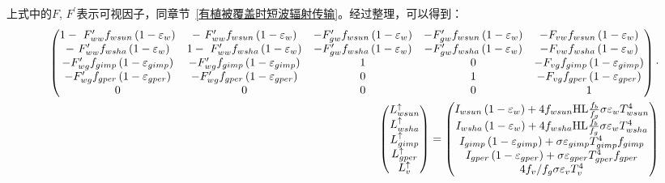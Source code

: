 \begin{landscape}
上式中的$F$, $F^\prime$表示可视因子，同章节~\ref{有植被覆盖时短波辐射传输}。经过整理，可以得到：
\begin{equation}
    \begin{split}
    \left(\begin{matrix}1-\ F_{ww}^\prime f_{wsun}\left(1-\varepsilon_w\right)&-\ F_{ww}^\prime f_{wsun}\left(1-\varepsilon_w\right)&-F_{gw}^\prime f_{wsun}\left(1-\varepsilon_w\right)&-F_{gw}^\prime f_{wsun}\left(1-\varepsilon_w\right)&-F_{vw}f_{wsun}\left(1-\varepsilon_w\right)\\
    -\ F_{ww}^\prime f_{wsha}\left(1-\varepsilon_w\right)&1-\ F_{ww}^\prime f_{wsha}\left(1-\varepsilon_w\right)&-F_{gw}^\prime f_{wsha}\left(1-\varepsilon_w\right)&-F_{gw}^\prime f_{wsha}\left(1-\varepsilon_w\right)&-F_{vw}f_{wsha}\left(1-\varepsilon_w\right)\\
    -F_{wg}^\prime f_{gimp}\left(1-\varepsilon_{gimp}\right)&-F_{wg}^\prime f_{gimp}\left(1-\varepsilon_{gimp}\right)&1&0&-F_{vg}f_{gimp}\left(1-\varepsilon_{gimp}\right)\\
    -F_{wg}^\prime f_{gper}\left(1-\varepsilon_{gper}\right)&-F_{wg}^\prime f_{gper}\left(1-\varepsilon_{gper}\right)&0&1&-F_{vg}f_{gper}\left(1-\varepsilon_{gper}\right)\\
    0&0&0&0&1\\\end{matrix}\right)\cdot \\
    \left(\begin{matrix}L_{wsun}^\uparrow\\L_{wsha}^\uparrow\\L_{gimp}^\uparrow\\L_{gper}^\uparrow\\L_v^\uparrow\\\end{matrix}\right)
    =\left(\begin{matrix}I_{wsun}\left(1-\varepsilon_w\right)+4f_{wsun} {\rm HL} \frac{f_b}{f_g} \sigma\varepsilon_wT_{wsun}^4 \\
        I_{wsha}\left(1-\varepsilon_w\right)+4f_{wsha}{ \rm HL} \frac{f_b}{f_g}\sigma\varepsilon_wT_{wsha}^4  \\
        I_{gimp}\left(1-\varepsilon_{gimp}\right)+\sigma\varepsilon_{gimp}T_{gimp}^4f_{gimp} \\
        I_{gper}\left(1-\varepsilon_{gper}\right)+\sigma\varepsilon_{gper}T_{gper}^4f_{gper}\\
        4f_v/f_g\sigma\varepsilon_vT_v^4\\\end{matrix}\right)
    \end{split}
\end{equation}
\end{landscape}

